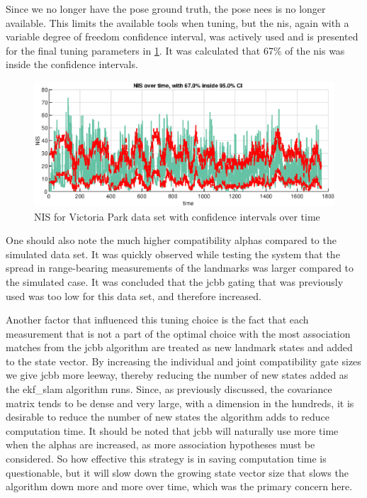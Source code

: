 Since we no longer have the pose ground truth, the pose \acrshort{nees} is no longer available. This limits the available tools when tuning, but the \acrshort{nis}, again with a variable degree of freedom confidence interval, was actively used and is presented for the final tuning parameters in \cref{fig:ga_3_real_NIS}. It was calculated that 67\% of the \acrshort{nis} was inside the confidence intervals.  

\begin{figure}[!htb]
    \centering
    \includegraphics[width=0.6\linewidth]{figures/ga_3/real_NIS.eps}
    \caption{NIS for Victoria Park data set with confidence intervals over time}
    \label{fig:ga_3_real_NIS}
\end{figure}

One should also note the much higher compatibility alphas compared to the simulated data set. It was quickly observed while testing the system that the spread in range-bearing measurements of the landmarks was larger compared to the simulated case. It was concluded that the \acrshort{jcbb} gating that was previously used was too low for this data set, and therefore increased.

Another factor that influenced this tuning choice is the fact that each measurement that is not a part of the optimal choice with the most association matches from the \acrshort{jcbb} algorithm are treated as new landmark states and added to the state vector. By increasing the individual and joint compatibility gate sizes we give \acrshort{jcbb} more leeway, thereby reducing the number of new states added as the \acrshort{ekf_slam} algorithm runs. Since, as previously discussed, the covariance matrix tends to be dense and very large, with a dimension in the hundreds, it is desirable to reduce the number of new states the algorithm adds to reduce computation time. It should be noted that \acrshort{jcbb} will naturally use more time when the alphas are increased, as more association hypotheses must be considered. So how effective this strategy is in saving computation time is questionable, but it will slow down the growing state vector size that slows the algorithm down more and more over time, which was the primary concern here. 

